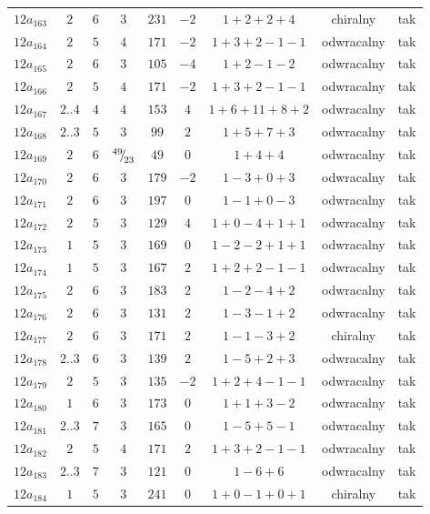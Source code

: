 \begin{longtable}{ccccccccc}
$12a_{163}$ & $2$ & $6$ & $3$ & $231$ & $-2$ & $1+2+2+4$ & chiralny & tak \\
$12a_{164}$ & $2$ & $5$ & $4$ & $171$ & $-2$ & $1+3+2-1-1$ & odwracalny & tak \\
$12a_{165}$ & $2$ & $6$ & $3$ & $105$ & $-4$ & $1+2-1-2$ & odwracalny & tak \\
$12a_{166}$ & $2$ & $5$ & $4$ & $171$ & $-2$ & $1+3+2-1-1$ & odwracalny & tak \\
$12a_{167}$ & $2..4$ & $4$ & $4$ & $153$ & $4$ & $1+6+11+8+2$ & odwracalny & tak \\
$12a_{168}$ & $2..3$ & $5$ & $3$ & $99$ & $2$ & $1+5+7+3$ & odwracalny & tak \\
$12a_{169}$ & $2$ & $6$ & ${}^{49}{\mskip -5mu/\mskip -3mu}_{23}$ & $49$ & $0$ & $1+4+4$ & odwracalny & tak \\
$12a_{170}$ & $2$ & $6$ & $3$ & $179$ & $-2$ & $1-3+0+3$ & odwracalny & tak \\
$12a_{171}$ & $2$ & $6$ & $3$ & $197$ & $0$ & $1-1+0-3$ & odwracalny & tak \\
$12a_{172}$ & $2$ & $5$ & $3$ & $129$ & $4$ & $1+0-4+1+1$ & odwracalny & tak \\
$12a_{173}$ & $1$ & $5$ & $3$ & $169$ & $0$ & $1-2-2+1+1$ & odwracalny & tak \\
$12a_{174}$ & $1$ & $5$ & $3$ & $167$ & $2$ & $1+2+2-1-1$ & odwracalny & tak \\
$12a_{175}$ & $2$ & $6$ & $3$ & $183$ & $2$ & $1-2-4+2$ & odwracalny & tak \\
$12a_{176}$ & $2$ & $6$ & $3$ & $131$ & $2$ & $1-3-1+2$ & odwracalny & tak \\
$12a_{177}$ & $2$ & $6$ & $3$ & $171$ & $2$ & $1-1-3+2$ & chiralny & tak \\
$12a_{178}$ & $2..3$ & $6$ & $3$ & $139$ & $2$ & $1-5+2+3$ & odwracalny & tak \\
$12a_{179}$ & $2$ & $5$ & $3$ & $135$ & $-2$ & $1+2+4-1-1$ & odwracalny & tak \\
$12a_{180}$ & $1$ & $6$ & $3$ & $173$ & $0$ & $1+1+3-2$ & odwracalny & tak \\
$12a_{181}$ & $2..3$ & $7$ & $3$ & $165$ & $0$ & $1-5+5-1$ & odwracalny & tak \\
$12a_{182}$ & $2$ & $5$ & $4$ & $171$ & $2$ & $1+3+2-1-1$ & odwracalny & tak \\
$12a_{183}$ & $2..3$ & $7$ & $3$ & $121$ & $0$ & $1-6+6$ & odwracalny & tak \\
$12a_{184}$ & $1$ & $5$ & $3$ & $241$ & $0$ & $1+0-1+0+1$ & chiralny & tak \\

\end{longtable}
